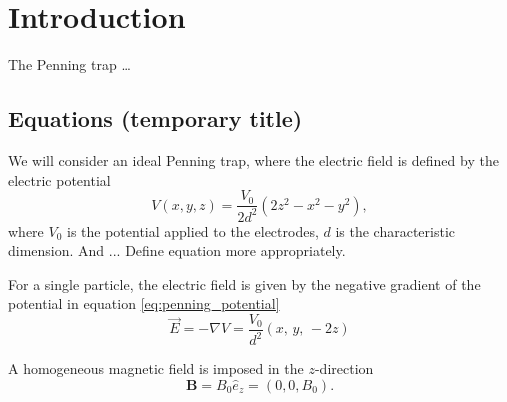 \section{Introduction}\label{sec:introduction}


The Penning trap \dots %



\subsection*{Equations (temporary title)}
We will consider an ideal Penning trap, where the electric field is defined by the electric potential 
\begin{equation}
    V(x,y,z) = \frac{V_0}{2d^2}(2z^2 - x^2 - y^2), \label{eq:penning_potential}
\end{equation}
where $V_0$ is the potential applied to the electrodes, $d$ is the characteristic dimension. And ... Define equation more appropriately. 

For a single particle, the electric field is given by the negative gradient of the potential in equation \eqref{eq:penning_potential}
\begin{equation}
    \vec{E} = -\nabla V = \frac{V_0}{d^2} (x,\,y,\,-2z) \label{eq:p1_E_field_pot_gradient}
\end{equation}

A homogeneous magnetic field is imposed in the $z$-direction 
\begin{equation}
    \mathbf{B}= B_0 \hat{e}_z = (0,0,B_0). \label{eq:homogeneous_B_field}
\end{equation}


